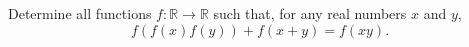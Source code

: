 Determine all functions $f: \mathbb{R} \rightarrow \mathbb{R}$ such that, for any real numbers $x$ and $y$, \[ f(f(x)f(y)) + f(x+y) = f(xy). \]
